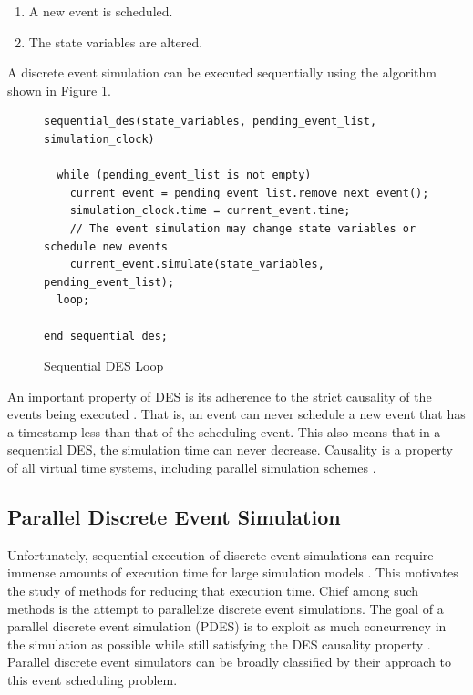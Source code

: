 \documentclass[11pt]{book}
\begin{document}
\begin{enumerate}
  \item A new event is scheduled.
  \item The state variables are altered.
\end{enumerate}

\noindent
A discrete event simulation can be executed sequentially using the algorithm shown in
Figure \ref{sequential-des}.

\begin{figure}
\centering
\begin{verbatim}
sequential_des(state_variables, pending_event_list, simulation_clock)

  while (pending_event_list is not empty)
    current_event = pending_event_list.remove_next_event();
    simulation_clock.time = current_event.time;
    // The event simulation may change state variables or schedule new events
    current_event.simulate(state_variables, pending_event_list);
  loop;

end sequential_des;
\end{verbatim}
\caption{Sequential DES Loop \cite{jacob-13}}\label{sequential-des}
\end{figure}

An important property of DES is its adherence to the strict causality of the events being
executed \cite{fujimoto-pdes}.  That is, an event can never schedule a new event that has
a timestamp less than that of the scheduling event.  This also means that in a sequential
DES, the simulation time can never decrease.  Causality is a property of all virtual time
systems, including parallel simulation schemes \cite{lamport-78}.

\subsection{Parallel Discrete Event Simulation}

Unfortunately, sequential execution of discrete event simulations can require immense
amounts of execution time for large simulation models \cite{fujimoto-pdes}.  This
motivates the study of methods for reducing that execution time.  Chief among such methods
is the attempt to parallelize discrete event simulations.  The goal of a parallel discrete
event simulation (PDES) is to exploit as much concurrency in the simulation as possible
while still satisfying the DES causality property \cite{fujimoto-89b,fujimoto-90}.
Parallel discrete event simulators can be broadly classified by their approach to this
event scheduling problem.
\end{document}
